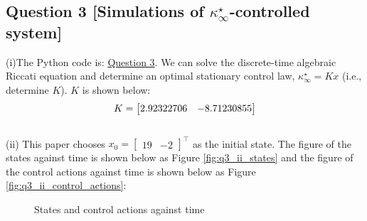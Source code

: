 \documentclass[a4paper,11pt,reqno]{amsart}
\newcommand{\tran}{\intercal}
\begin{document}
\subsection*{Question 3 [Simulations of \texorpdfstring{$\kappa ^{\star}_{\infty}$}{Lg}-controlled system]}\label{sec:q3}
(i)The Python code is: \href{https://github.com/Gczmy/ELE8088/blob/main/Lab1/Python_code/Question3/Question3.py}{Question 3}. We can solve the discrete-time algebraic Riccati equation and
determine an optimal stationary control law, $\kappa^{\star}_{\infty}=Kx$ (i.e., determine $K$). $K$ is shown below:
\begin{equation}
    K =
    \begin{bmatrix}
        2.92322706 & -8.71230855
    \end{bmatrix}
    \notag
\end{equation}
\\
(ii)
This paper chooses $x_0 = \begin{bmatrix} 19 & -2 \end{bmatrix}^{\tran}$ as the initial state. The figure of the states against time is shown below as Figure \ref{fig:q3_ii_states} 
and the figure of the control actions against time is shown below as Figure \ref{fig:q3_ii_control_actions}:
\begin{figure}[H]
    \centering
    \vspace{-0.35cm}
    \subfigtopskip=2pt
    \subfigbottomskip=2pt
    \subfigcapskip=-5pt
    \quad
    \caption{States and control actions against time}
    \label{fig:q3_ii}
\end{figure}
\end{document}
